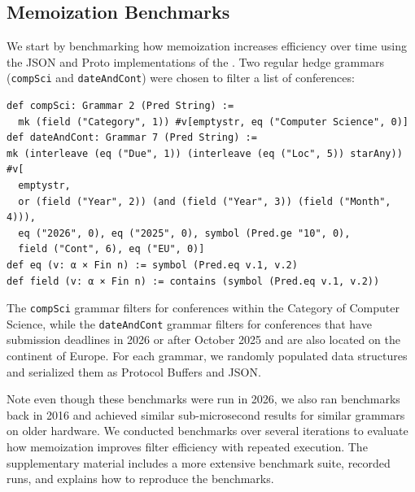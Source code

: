 \documentclass[runningheads]{llncs}
\newcommand{\Parser}{\link{Parser}{class Parser}}
\newcommand{\supplementarymaterial}{%
  supplementary material\xspace%
}
\newcommand{\JSON}{\ac{JSON}\xspace}
\begin{document}
\subsection{Memoization Benchmarks}

We start by benchmarking how memoization increases efficiency over time using the \JSON and Proto implementations of the \Parser.
Two regular hedge grammars (\lstinline{compSci} and \lstinline{dateAndCont}) were chosen to filter a list of conferences:
\begin{lstlisting}
def compSci: Grammar 2 (Pred String) :=
  mk (field ("Category", 1)) #v[emptystr, eq ("Computer Science", 0)]
def dateAndCont: Grammar 7 (Pred String) :=
mk (interleave (eq ("Due", 1)) (interleave (eq ("Loc", 5)) starAny)) #v[
  emptystr,
  or (field ("Year", 2)) (and (field ("Year", 3)) (field ("Month", 4))),
  eq ("2026", 0), eq ("2025", 0), symbol (Pred.ge "10", 0),
  field ("Cont", 6), eq ("EU", 0)]
def eq (v: α × Fin n) := symbol (Pred.eq v.1, v.2)
def field (v: α × Fin n) := contains (symbol (Pred.eq v.1, v.2))
\end{lstlisting}
The \lstinline{compSci} grammar filters for conferences within the Category of Computer Science, while the \lstinline{dateAndCont} grammar filters for conferences that have submission deadlines in 2026 or after October 2025 and are also located on the continent of Europe.
For each grammar, we randomly populated data structures and serialized them as Protocol Buffers and \JSON.

Note even though these benchmarks were run in 2026, we also ran benchmarks back in 2016 and achieved similar sub-microsecond results for similar grammars on older hardware.
We conducted benchmarks over several iterations to evaluate how memoization improves filter efficiency with repeated execution.
The \supplementarymaterial includes a more extensive benchmark suite, recorded runs, and explains how to reproduce the benchmarks.
\end{document}
